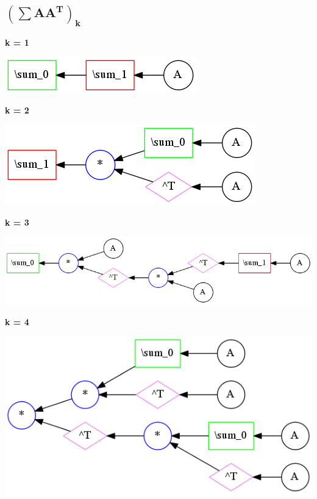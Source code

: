 

\subsection{$\mathbf{(\sum AA^T)_k}$}



{\bf k = 1}


\begin{center}
\includegraphics[width=0.45\linewidth]{trees/SumAAT_1_horizontal_0.png}
\end{center}


{\bf k = 2}


\begin{center}
\includegraphics[width=0.45\linewidth]{trees/SumAAT_2_horizontal_0.png}
\end{center}


{\bf k = 3}


\begin{center}
\includegraphics[width=0.45\linewidth]{trees/SumAAT_3_horizontal_0.png}
\end{center}


{\bf k = 4}


\begin{center}
\includegraphics[width=0.45\linewidth]{trees/SumAAT_4_horizontal_0.png}
\end{center}


